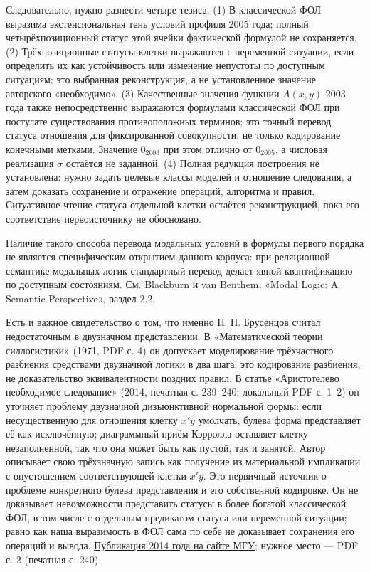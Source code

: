 \documentclass[12pt,a4paper]{article}
\begin{document}
Следовательно, нужно разнести четыре тезиса. (1) В классической ФОЛ выразима экстенсиональная тень условий профиля 2005 года; полный четырёхпозиционный статус этой ячейки фактической формулой не сохраняется. (2) Трёхпозиционные статусы клетки выражаются с переменной ситуации, если определить их как устойчивость или изменение непустоты по доступным ситуациям; это выбранная реконструкция, а не установленное значение авторского «необходимо». (3) Качественные значения функции \(A(x,y)\) 2003 года также непосредственно выражаются формулами классической ФОЛ при постулате существования противоположных терминов; это точный перевод статуса отношения для фиксированной совокупности, не только кодирование конечными метками. Значение \(0_{2003}\) при этом отлично от \(0_{2005}\), а числовая реализация \(\sigma\) остаётся не заданной. (4) Полная редукция построения не установлена: нужно задать целевые классы моделей и отношение следования, а затем доказать сохранение и отражение операций, алгоритма и правил. Ситуативное чтение статуса отдельной клетки остаётся реконструкцией, пока его соответствие первоисточнику не обосновано.

Наличие такого способа перевода модальных условий в формулы первого порядка не является специфическим открытием данного корпуса: при реляционной семантике модальных логик стандартный перевод делает явной квантификацию по доступным состояниям. См. Blackburn и van Benthem, «Modal Logic: A Semantic Perspective», раздел 2.2.

Есть и важное свидетельство о том, что именно Н. П. Брусенцов считал недостаточным в двузначном представлении. В «Математической теории силлогистики» (1971, PDF с. 4) он допускает моделирование трёхчастного разбиения средствами двузначной логики в два шага; это кодирование разбиения, не доказательство эквивалентности поздних правил. В статье «Аристотелево необходимое следование» (2014, печатная с. 239–240; локальный PDF с. 1–2) он уточняет проблему двузначной дизъюнктивной нормальной формы: если несущественную для отношения клетку \(x'y\) умолчать, булева форма представляет её как исключённую; диаграммный приём Кэрролла оставляет клетку незаполненной, так что она может быть как пустой, так и занятой. Автор описывает свою трёхзначную запись как получение из материальной импликации с опустошением соответствующей клетки \(x'y\). Это первичный источник о проблеме конкретного булева представления и его собственной кодировке. Он не доказывает невозможности представить статусы в более богатой классической ФОЛ, в том числе с отдельным предикатом статуса или переменной ситуации; равно как наша выразимость в ФОЛ сама по себе не доказывает сохранения его операций и вывода. \href{https://ternarycomp.cs.msu.ru/Papers/Brusen_IMI14_Neobh_sled.pdf}{Публикация 2014 года на сайте МГУ}; нужное место — PDF с. 2 (печатная с. 240).
\end{document}
